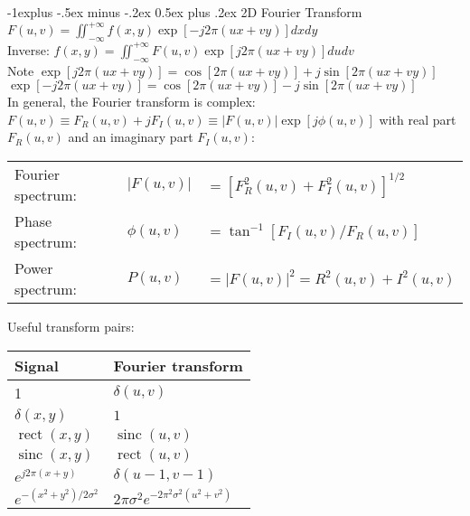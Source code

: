 \documentclass[dvipdfmx,a4paper,10pt,landscape]{article}
\makeatletter
\renewcommand{\subsection}{\@startsection{subsection}{2}{0mm}%
                                {-1explus -.5ex minus -.2ex}%
                                {0.5ex plus .2ex}%
                                {\normalfont\normalsize\bfseries}}
\DeclareMathOperator{\sinc}{sinc}
\DeclareMathOperator{\rect}{rect}
\makeatother
\begin{document}
\begin{multicols}{3}
    \subsection{2D Fourier Transform}
    $
        F(u,v)=\iint_{-\infty}^{+\infty}f(x,y)\exp[-j2\pi(ux+vy)]dxdy
    $\\
    Inverse:
    $
        f(x,y)=\iint_{-\infty}^{+\infty}F(u,v)\exp[j2\pi(ux+vy)]dudv
    $\\
    Note
    $
        \exp[j2\pi(ux+vy)]   =\cos[2\pi(ux+vy)]+j\sin[2\pi(ux+vy)]    $\\
    $  \exp[-j2\pi(ux+vy)]  =\cos[2\pi(ux+vy)]-j\sin[2\pi(ux+vy)]
    $\\
    In general, the Fourier transform is complex:
    $
        F(u,v)\equiv F_R(u,v)+jF_I(u,v)\equiv|F(u,v)|\exp[j\phi(u,v)]
    $
    with real part $F_R(u,v)$ and an imaginary part $F_I(u,v)$:
    \begin{center}
        \begin{tabular} {lll}
            Fourier spectrum: & $|F(u,v)|$  & $=[F_R^2(u,v)+F_I^2(u,v)]^{1/2}$ \\
            Phase spectrum:   & $\phi(u,v)$ & $=\tan^{-1}[F_I(u,v)/F_R(u,v)]$  \\
            Power spectrum:   & $P(u,v)$    & $=|F(u,v)|^2=R^2(u,v)+I^2(u,v)$
        \end{tabular}
    \end{center}
    Useful transform pairs:
    \begin{center}
        \begin{tabular}{ll}
            \hline
            Signal                     & Fourier transform                          \\
            \hline
            1                          & $\delta(u,v)$                              \\
            $\delta(x,y)$              & $1$                                        \\
            $\rect(x,y)$               & $\sinc(u,v)$                               \\
            $\sinc(x,y)$               & $\rect(u,v)$                               \\
            $e^{j2\pi(x+y)}$           & $\delta(u-1,v-1)$                          \\
            $e^{-(x^2+y^2)/2\sigma^2}$ & $2\pi\sigma^2e^{-2\pi^2\sigma^2(u^2+v^2)}$
        \end{tabular}
    \end{center}


\end{multicols}
\end{document}
